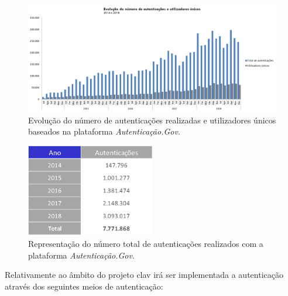 \begin{figure}[h]
    \centering
    \includegraphics[width=\textwidth]{img/authgov/authgovusage.png}
    \caption{Evolução do número de autenticações realizadas e utilizadores únicos baseados na plataforma \emph{Autenticação.Gov}.\cite{authGovStats}}
\end{figure}

\begin{figure}[h]
    \centering
    \includegraphics[width=0.5\textwidth]{img/authgov/authAnos.png}
    \caption{Representação do número total de autenticações realizados com a plataforma \emph{Autenticação.Gov}.\cite{authGovStats}}
\end{figure}

Relativamente ao âmbito do projeto \gls{clav} irá ser implementada a autenticação através dos seguintes meios de autenticação:

